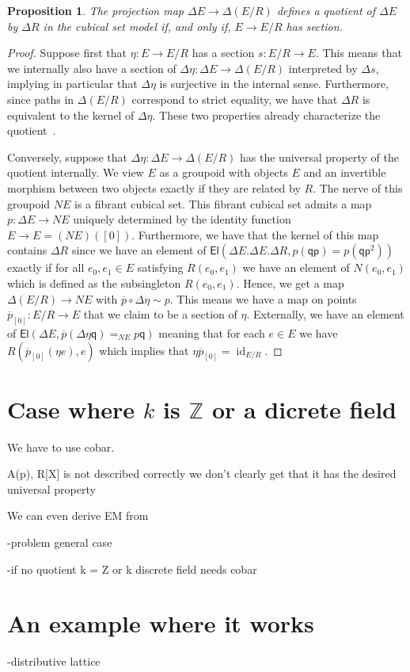 \documentclass[10pt,a4paper]{article}
\newtheorem{proposition}{Proposition}[section]
\newcommand{\ints}{\mathbb{Z}}
\newcommand\El{\mathsf{El}}
\newcommand\p{\mathsf{p}}
\newcommand\q{\mathsf{q}}
\DeclareMathOperator\id{id}
\begin{document}
\begin{proposition}
  The projection map $\Delta E \rightarrow \Delta (E/R)$ defines a quotient of $\Delta E$
  by $\Delta R$ in the cubical set model if, and only if, $E\rightarrow E/R$ has section.
\end{proposition}
\begin{proof}
  Suppose first that $\eta \colon E \to E/R$ has a section $s \colon E/R \to E$.
  This means that we internally also have a section of $\Delta\eta \colon \Delta E \to \Delta(E/R)$ interpreted by $\Delta s$, implying in particular that $\Delta \eta$ is surjective in the internal sense.
  Furthermore, since paths in $\Delta (E/R)$ correspond to strict equality, we have that $\Delta R$ is equivalent to the kernel of $\Delta\eta$.
  These two properties already characterize the quotient~\cite[Theorem~18.2.3]{rijke2025intro}.

  Conversely, suppose that $\Delta\eta \colon \Delta E \to \Delta(E/R)$ has the universal property of the quotient internally.
  We view $E$ as a groupoid with objects $E$ and an invertible morphism between two objects exactly if they are related by $R$.
  The nerve of this groupoid $NE$ is a fibrant cubical set.
  This fibrant cubical set admits a map $p \colon \Delta E \to NE$ uniquely determined by the identity function $E \to E = (NE)([0])$.
  Furthermore, we have that the kernel of this map contains $\Delta R$ since we have an element of $\El(\Delta E. \Delta E. \Delta R, p(\q\p) = p(\q\p^2))$ exactly if for all $e_0, e_1 \in E$ satisfying $R(e_0, e_1)$ we have an element of $N(e_0, e_1)$ which is defined as the subsingleton $R(e_0, e_1)$.
  Hence, we get a map $\Delta(E/R) \to NE$ with $\overline p \circ \Delta\eta \sim p$.
  This means we have a map on points $\overline{p}_{[0]} \colon E/R \to E$ that we claim to be a section of \(\eta\).
  Externally, we have an element of $\El(\Delta E, \overline p (\Delta\eta\q) =_{NE} p\q)$ meaning that for each $e \in E$ we have $R(\overline p_{[0]}(\eta e), e)$ which implies that $\eta \overline{p}_{[0]} = \id_{E/R}$.
\end{proof}

\section{Case where $k$ is $\ints$ or a dicrete field}

 We have to use cobar.


A(p), R[X] is not described correctly
we don't clearly get that it has the desired universal property

We can even derive EM from


-problem general case

-if no quotient k = Z or k discrete field needs cobar

\section{An example where it works}

-distributive lattice




\end{document}
